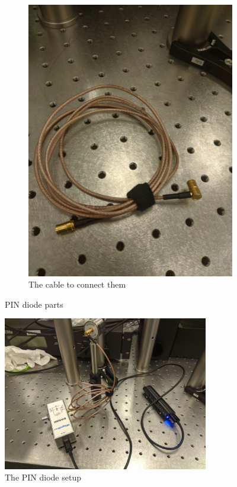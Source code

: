 \documentclass[a4paper, 10pt]{article}
\begin{document}
\begin{figure}[h]
\begin{subfigure}{0.4\textwidth}
        \includegraphics[width=\textwidth,angle=-90]{./images/pin-cable.jpg}
        \caption{The cable to connect them}
        \label{fig:pin-diode}
    \end{subfigure}
    \caption{PIN diode parts}
    \label{fig:pin-parts}
\end{figure}

\begin{figure}[H]
    \centering
    \includegraphics[width=0.8\textwidth]{./images/pin-setup.jpg}
    \caption{The PIN diode setup}
    \label{fig:pin-setup}
\end{figure}
\end{document}
